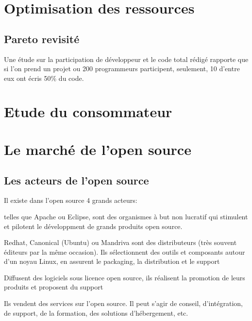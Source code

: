 	\section{Optimisation des ressources} %

		\subsection{Pareto revisité}

			Une étude sur la participation de développeur et le code total rédigé rapporte que si l'on prend un projet ou 200 programmeurs participent, seulement, 10 d'entre eux ont écris 50\% du code.

	\section{Etude du consommateur} %



	\section{Le marché de l'open source} %

		\subsection{Les acteurs de l'open source}
			Il existe dans l'open source 4 grands acteurs:

			\begin{description}[font=\color{burntorange}]
				\item[Les fondations:] telles que Apache ou Eclipse, sont des organismes à but non lucratif qui stimulent et pilotent le développment de grands produits open source.
				\item[Les distributeurs:] Redhat, Canonical (Ubuntu) ou Mandriva sont des distributeurs (très souvent éditeurs par la même occasion). Ils sélectionnent des outils et composants autour d'un noyau Linux, en assurent le packaging, la distribution et le support
				\item[Les éditeurs:] Diffusent des logiciels sous licence open source, ils réalisent la promotion de leurs produits et proposent du support
				\item[Les prestataires: ] Ils vendent des services sur l'open source. Il peut s'agir de conseil, d'intégration, de support, de la formation, des solutions d'hébergement, etc.
			\end{description}

